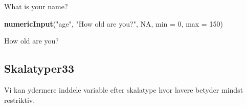 \documentclass[]{book}
\newenvironment{Shaded}{\begin{snugshade}}{\end{snugshade}}
\newcommand{\DataTypeTok}[1]{\textcolor[rgb]{0.13,0.29,0.53}{#1}}
\newcommand{\DecValTok}[1]{\textcolor[rgb]{0.00,0.00,0.81}{#1}}
\newcommand{\KeywordTok}[1]{\textcolor[rgb]{0.13,0.29,0.53}{\textbf{#1}}}
\newcommand{\NormalTok}[1]{#1}
\newcommand{\OtherTok}[1]{\textcolor[rgb]{0.56,0.35,0.01}{#1}}
\newcommand{\StringTok}[1]{\textcolor[rgb]{0.31,0.60,0.02}{#1}}
\theoremstyle{definition}
\theoremstyle{definition}
\theoremstyle{definition}
\theoremstyle{remark}
\begin{document}
What is your name?

\begin{Shaded}
\begin{Highlighting}[]
\KeywordTok{numericInput}\NormalTok{(}\StringTok{"age"}\NormalTok{, }\StringTok{"How old are you?"}\NormalTok{, }\OtherTok{NA}\NormalTok{, }\DataTypeTok{min =} \DecValTok{0}\NormalTok{, }\DataTypeTok{max =} \DecValTok{150}\NormalTok{)}
\end{Highlighting}
\end{Shaded}

How old are you?

\hypertarget{skalatyper33}{%
\subsection{Skalatyper33}\label{skalatyper33}}

Vi kan ydermere inddele variable efter skalatype hvor lavere betyder
mindst restriktiv.
\end{document}

